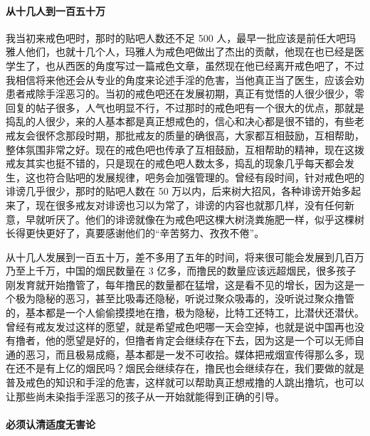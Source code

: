 \paragraph{从十几人到一百五十万}

我当初来戒色吧时，那时的贴吧人数还不足 500 人，最早一批应该是前任大吧玛雅人他们，也就十几个人，玛雅人为戒色吧做出了杰出的贡献，他现在也已经是医学生了，也从西医的角度写过一篇戒色文章，虽然现在他已经离开戒色吧了，不过我相信将来他还会从专业的角度来论述手淫的危害，当他真正当了医生，应该会劝患者戒除手淫恶习的。当初的戒色吧还在发展初期，真正有觉悟的人很少很少，零回复的帖子很多，人气也明显不行，不过那时的戒色吧有一个很大的优点，那就是捣乱的人很少，来的人基本都是真正想戒色的，信心和决心都是很不错的，有些老戒友会很怀念那段时期，那批戒友的质量的确很高，大家都互相鼓励，互相帮助，整体氛围非常之好。现在的戒色吧也传承了互相鼓励，互相帮助的精神，现在这拨戒友其实也挺不错的，只是现在的戒色吧人数太多，捣乱的现象几乎每天都会发生，这也符合贴吧的发展规律，吧务会加强管理的。曾经有段时间，针对戒色吧的诽谤几乎很少，那时的贴吧人数在 50 万以内，后来树大招风，各种诽谤开始多起来了，现在很多戒友对诽谤也习以为常了，诽谤的内容也就那几样，没有任何新意，早就听厌了。他们的诽谤就像在为戒色吧这棵大树浇粪施肥一样，似乎这棵树长得更快更好了，真要感谢他们的“辛苦努力、孜孜不倦”。

从十几人发展到一百五十万，差不多用了五年的时间，将来很可能会发展到几百万乃至上千万，中国的烟民数量在 3 亿多，而撸民的数量应该远超烟民，很多孩子刚发育就开始撸管了，每年撸民的数量都在猛增，这是看不见的增长，因为这是一个极为隐秘的恶习，甚至比吸毒还隐秘，听说过聚众吸毒的，没听说过聚众撸管的，基本都是一个人偷偷摸摸地在撸，极为隐秘，比特工还特工，比潜伏还潜伏。曾经有戒友发过这样的愿望，就是希望戒色吧哪一天会空掉，也就是说中国再也没有撸者，他的愿望是好的，但撸者肯定会继续存在下去，因为这是一个可以无师自通的恶习，而且极易成瘾，基本都是一发不可收拾。媒体把戒烟宣传得那么多，现在还不是有上亿的烟民吗？烟民会继续存在，撸民也会继续存在，我们要做的就是普及戒色的知识和手淫的危害，这样就可以帮助真正想戒撸的人跳出撸坑，也可以让那些尚未染指手淫恶习的孩子从一开始就能得到正确的引导。

\paragraph{必须认清适度无害论}

